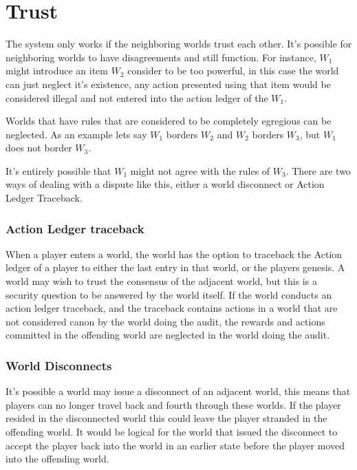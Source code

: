 \documentclass[runningheads,a4paper]{llncs}
\begin{document}
\section{Trust}
The system only works if the neighboring worlds trust each other. It's possible for neighboring worlds to have disagreements and still function. For instance, $W_1$ might introduce an item $W_2$ consider to be too powerful, in this case the world can just neglect it's existence, any action presented using that item would be considered illegal and not entered into the action ledger of the $W_1$.

Worlds that have rules that are considered to be completely egregious can be neglected. As an example lets say $W_1$ borders $W_2$ and $W_2$ borders $W_3$, but $W_1$ does not border $W_3$. 

\begin{center}
\end{center}

It's entirely possible that $W_1$ might not agree with the rules of $W_3$. There are two ways of dealing with a dispute like this, either a world disconnect or Action Ledger Traceback. 

\subsubsection{Action Ledger traceback}
When a player enters a world, the world has the option to traceback the Action ledger of a player to either the last entry in that world, or the players genesis. A world may wish to trust the consensus of the adjacent world, but this is a security question to be answered by the world itself. If the world conducts an action ledger traceback, and the traceback contains actions in a world that are not considered canon by the world doing the audit, the rewards and actions committed in the offending world are neglected in the world doing the audit.

\subsubsection{World Disconnects}
It's possible a world may issue a disconnect of an adjacent world, this means that players can no longer travel back and fourth through these worlds. If the player resided in the disconnected world this could leave the player stranded in the offending world. It would be logical for the world that issued the disconnect to accept the player back into the world in an earlier state before the player moved into the offending world. 


\end{document}
